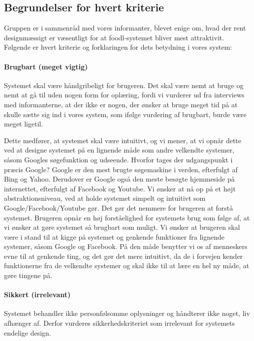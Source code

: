 \subsection{Begrundelser for hvert kriterie}
\label{sec:begrundelsekriterier}
Gruppen er i sammenråd med vores informanter, blevet enige om, hvad der rent designmæssigt er væsentligt for at foodl-systemet bliver mest attraktivit. Følgende er hvert kriterie og forklaringen for dets betydning i vores system:

\paragraph{Brugbart (meget vigtig)} 
Systemet skal være håndgribeligt for brugeren. Det skal være nemt at bruge og nemt at gå til uden nogen form for oplæring, fordi vi vurderer ud fra interviews med informanterne, at der ikke er nogen, der ønsker at bruge meget tid på at skulle sætte sig ind i vores system, som ifølge vurdering af brugbart, burde være meget ligetil. 

Dette medfører, at systemet skal være intuitivt, og vi mener, at vi opnår dette ved at designe systemet på en lignende måde som andre velkendte systemer, såsom Googles søgefunktion og udseende. Hvorfor tages der udgangspunkt i præcis Google? Google er den mest brugte søgemaskine i verden, efterfulgt af Bing og Yahoo.\cite{googlesoeg} \cite{ebizmba} Derudover er Google også den meste besøgte hjemmeside på internettet, efterfulgt af Facebook og Youtube. \cite{alexadk} Vi ønsker at nå op på et højt abstraktionsniveau, ved at holde systemet simpelt og intuitivt som Google/Facebook/Youtube gør. Det gør det nemmere for brugeren at forstå systemet. Brugeren opnår en høj forståelighed for systemets brug som følge af, at vi ønsker at gøre systemet så brugbart som muligt. Vi ønsker at brugeren skal være i stand til at kigge på systemet og genkende funktioner fra lignende systemer, såsom Google og Facebook. På den måde benytter vi os af menneskers evne til at genkende ting, og det gør det mere intuitivt, da de i forvejen kender funktionerne fra de velkendte systemer og skal ikke til at lære en hel ny måde, at gøre tingene på.

\paragraph{Sikkert (irrelevant)} 
Systemet behandler ikke personfølsomme oplysninger og håndterer ikke noget, liv afhænger af. Derfor vurderes sikkerhedskriteriet som irrelevant for systemets endelige design.

